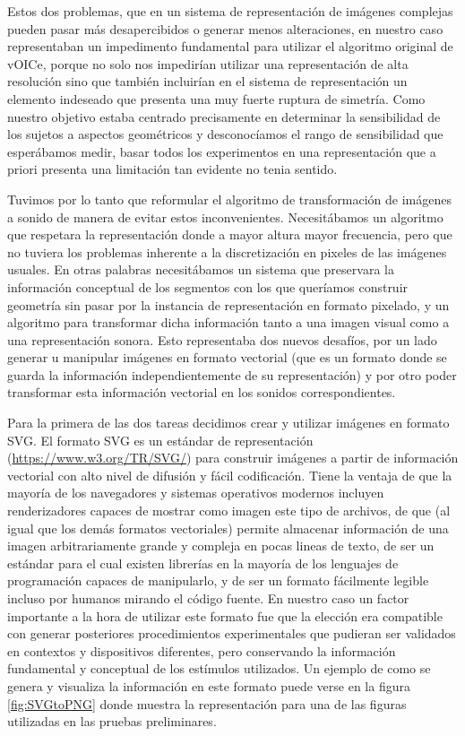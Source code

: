 \documentclass{article}
\begin{document}
    Estos dos problemas, que en un sistema de representación de imágenes complejas pueden pasar más desapercibidos o generar menos alteraciones, en nuestro caso representaban un impedimento fundamental para utilizar el algoritmo original de vOICe, porque no solo nos impedirían utilizar una representación de alta resolución sino que también incluirían en el sistema de representación un elemento indeseado que presenta una muy fuerte ruptura de simetría. Como nuestro objetivo estaba centrado precisamente en determinar la sensibilidad de los sujetos a aspectos geométricos y desconocíamos el rango de sensibilidad que esperábamos medir, basar todos los experimentos en una representación que a priori presenta una limitación tan evidente no tenia sentido. 
    
    Tuvimos por lo tanto que reformular el algoritmo de transformación de imágenes a sonido de manera de evitar estos inconvenientes. Necesitábamos un algoritmo que respetara la representación donde a mayor altura mayor frecuencia, pero que no tuviera los problemas inherente a la discretización en pixeles de las imágenes usuales. En otras palabras necesitábamos un sistema que preservara la información conceptual de los segmentos con los que queríamos construir geometría sin pasar por la instancia de representación en formato pixelado, y un algoritmo para transformar dicha información tanto a una imagen visual como a una representación sonora. Esto representaba dos nuevos desafíos, por un lado generar u manipular imágenes en formato vectorial (que es un formato donde se guarda la información independientemente de su representación) y por otro poder transformar esta información vectorial en los sonidos correspondientes. 
    
    Para la primera de las dos tareas decidimos crear y utilizar imágenes en formato SVG. El formato SVG es un estándar de representación (\url{https://www.w3.org/TR/SVG/}) para construir imágenes a partir de información vectorial con alto nivel de difusión y fácil codificación. Tiene la ventaja de que la mayoría de los navegadores y sistemas operativos modernos incluyen renderizadores capaces de mostrar como imagen este tipo de archivos, de que (al igual que los demás formatos vectoriales) permite almacenar información de una imagen arbitrariamente grande y compleja en pocas lineas de texto, de ser un estándar para el cual existen librerías en la mayoría de los lenguajes de programación capaces de manipularlo, y de ser un formato fácilmente legible incluso por humanos mirando el código fuente. En nuestro caso un factor importante a la hora de utilizar este formato fue que la elección era compatible con generar posteriores procedimientos experimentales que pudieran ser validados en contextos y dispositivos diferentes, pero conservando la información fundamental y conceptual de los estímulos utilizados. Un ejemplo de como se genera y visualiza la información en este formato puede verse en la figura \ref{fig:SVGtoPNG} donde muestra la representación para una de las figuras utilizadas en las pruebas preliminares. 
    
\end{document}
